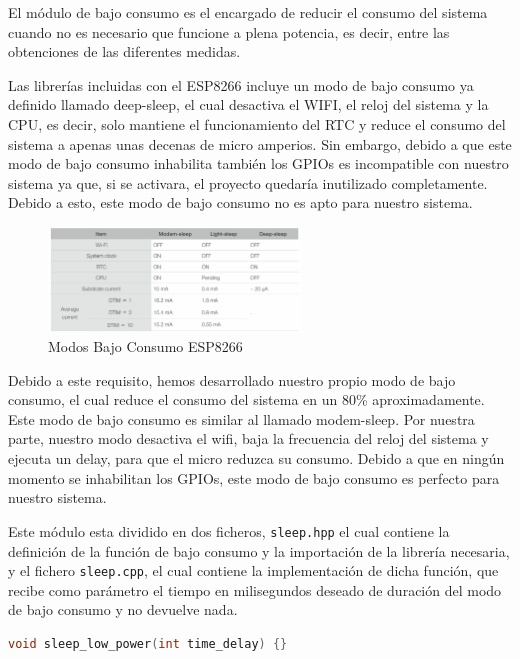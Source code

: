 El módulo de bajo consumo es el encargado de reducir el consumo del sistema cuando no es necesario que funcione a plena potencia, es decir, entre las obtenciones de las diferentes medidas.


Las librerías incluidas con el ESP8266 incluye un modo de bajo consumo ya definido llamado deep-sleep, el cual desactiva el WIFI, el reloj del sistema y la CPU, es decir, solo mantiene el funcionamiento del RTC y reduce el consumo del sistema a apenas unas decenas de micro amperios. Sin embargo, debido a que este modo de bajo consumo inhabilita también los GPIOs es incompatible con nuestro sistema ya que, si se activara, el proyecto quedaría inutilizado completamente. Debido a esto, este modo de bajo consumo no es apto para nuestro sistema. \cite{esp8266ESP8266LowPower}

\begin{figure}[H]
    \centering
    \includegraphics[width=0.6\textwidth]{images/3-software/3-2-5-lowpower/Modos Bajo Consumo.png}
    \caption{Modos Bajo Consumo ESP8266}
    \label{fig:3-2-5-1-ModosBajoConsumo}
\end{figure}

Debido a este requisito, hemos desarrollado nuestro propio modo de bajo consumo, el cual reduce el consumo del sistema en un 80\% aproximadamente. Este modo de bajo consumo es similar al llamado modem-sleep. Por nuestra parte, nuestro modo desactiva el wifi, baja la frecuencia del reloj del sistema y ejecuta un delay, para que el micro reduzca su consumo. Debido a que en ningún momento se inhabilitan los GPIOs, este modo de bajo consumo es perfecto para nuestro sistema.


Este módulo esta dividido en dos ficheros, \texttt{sleep.hpp} el cual contiene la definición de la función de bajo consumo y la importación de la librería necesaria, y el fichero \texttt{sleep.cpp}, el cual contiene la implementación de dicha función, que recibe como parámetro el tiempo en milisegundos deseado de duración del modo de bajo consumo y no devuelve nada.

\begin{lstlisting}[captionpos=b, caption={Función bajo consumo}, language=c++]
    void sleep_low_power(int time_delay) {}
\end{lstlisting}

